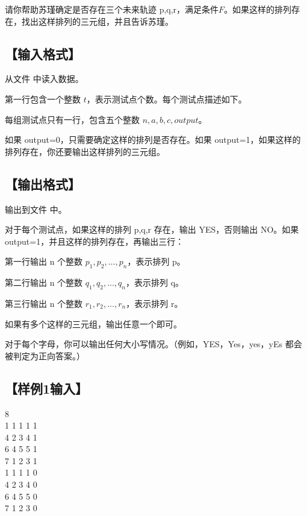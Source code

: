 \documentclass{statement}
\begin{document}
	

	
	
	
	请你帮助苏瑾确定是否存在三个未来轨迹 p,q,r，满足条件$F$。如果这样的排列存在，找出这样排列的三元组，并且告诉苏瑾。
	

	\subsection[输入格式]{【输入格式】}
		从文件  中读入数据。

	第一行包含一个整数 $t$，表示测试点个数。每个测试点描述如下。

	每组测试点只有一行，包含五个整数 $n,a,b,c,output$。

	如果 output=0，只需要确定这样的排列是否存在。如果 output=1，如果这样的排列存在，你还要输出这样排列的三元组。


\subsection[输出格式]{【输出格式】}
		输出到文件  中。

对于每个测试点，如果这样的排列 p,q,r 存在，输出 YES，否则输出 NO。如果 output=1，并且这样的排列存在，再输出三行：

第一行输出 n 个整数 $p_1,p_2,\ldots,p_n$，表示排列 p。

第二行输出 n 个整数 $q_1,q_2,\ldots,q_n$，表示排列 q。

第三行输出 n 个整数 $r_1,r_2,\ldots,r_n$，表示排列 r。

如果有多个这样的三元组，输出任意一个即可。

对于每个字母，你可以输出任何大小写情况。（例如，YES，Yes，yes，yEs 都会被判定为正向答案。）

\subsection[样例1输入]{【样例1输入】}
\begin{example}
8\\
1 1 1 1 1\\
4 2 3 4 1\\
6 4 5 5 1\\
7 1 2 3 1\\
1 1 1 1 0\\
4 2 3 4 0\\
6 4 5 5 0\\
7 1 2 3 0

\end{example}
\end{document}
